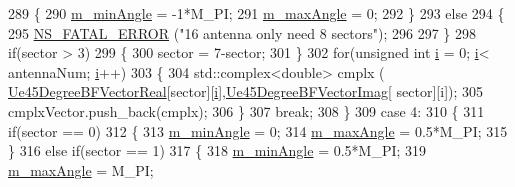 \begin{DoxyCode}
289                         \{
290                                 \hyperlink{classns3_1_1AntennaArrayModel_a07697f3127921e2f89bbd4250a9ef731}{m\_minAngle} = -1*M\_PI;
291                                 \hyperlink{classns3_1_1AntennaArrayModel_a26e13d2c83e29ce7d13d6dec94131589}{m\_maxAngle} = 0;
292                         \}
293                         \textcolor{keywordflow}{else}
294                         \{
295                                 \hyperlink{group__fatal_ga5131d5e3f75d7d4cbfd706ac456fdc85}{NS\_FATAL\_ERROR} (\textcolor{stringliteral}{"16 antenna only need 8 sectors"});
296 
297                         \}
298                         \textcolor{keywordflow}{if}(sector > 3)
299                         \{
300                                 sector = 7-sector;
301                         \}
302                         \textcolor{keywordflow}{for}(\textcolor{keywordtype}{unsigned} \textcolor{keywordtype}{int} \hyperlink{bernuolliDistribution_8m_a6f6ccfcf58b31cb6412107d9d5281426}{i} = 0; \hyperlink{bernuolliDistribution_8m_a6f6ccfcf58b31cb6412107d9d5281426}{i}< antennaNum; \hyperlink{bernuolliDistribution_8m_a6f6ccfcf58b31cb6412107d9d5281426}{i}++)
303                         \{
304                                 std::complex<double> cmplx (
      \hyperlink{namespacens3_abc210111eb8cc9bd3f3e540be824dffb}{Ue45DegreeBFVectorReal}[sector][\hyperlink{bernuolliDistribution_8m_a6f6ccfcf58b31cb6412107d9d5281426}{i}],\hyperlink{namespacens3_aad1a7e1ad7e3c44907e3df8b1b4afc34}{Ue45DegreeBFVectorImag}[
      sector][i]);
305                                 cmplxVector.push\_back(cmplx);
306                         \}
307                         \textcolor{keywordflow}{break};
308                 \}
309                 \textcolor{keywordflow}{case} 4:
310                 \{
311                         \textcolor{keywordflow}{if}(sector == 0)
312                         \{
313                                 \hyperlink{classns3_1_1AntennaArrayModel_a07697f3127921e2f89bbd4250a9ef731}{m\_minAngle} = 0;
314                                 \hyperlink{classns3_1_1AntennaArrayModel_a26e13d2c83e29ce7d13d6dec94131589}{m\_maxAngle} = 0.5*M\_PI;
315                         \}
316                         \textcolor{keywordflow}{else} \textcolor{keywordflow}{if}(sector == 1)
317                         \{
318                                 \hyperlink{classns3_1_1AntennaArrayModel_a07697f3127921e2f89bbd4250a9ef731}{m\_minAngle} = 0.5*M\_PI;
319                                 \hyperlink{classns3_1_1AntennaArrayModel_a26e13d2c83e29ce7d13d6dec94131589}{m\_maxAngle} = M\_PI;

\end{DoxyCode}
